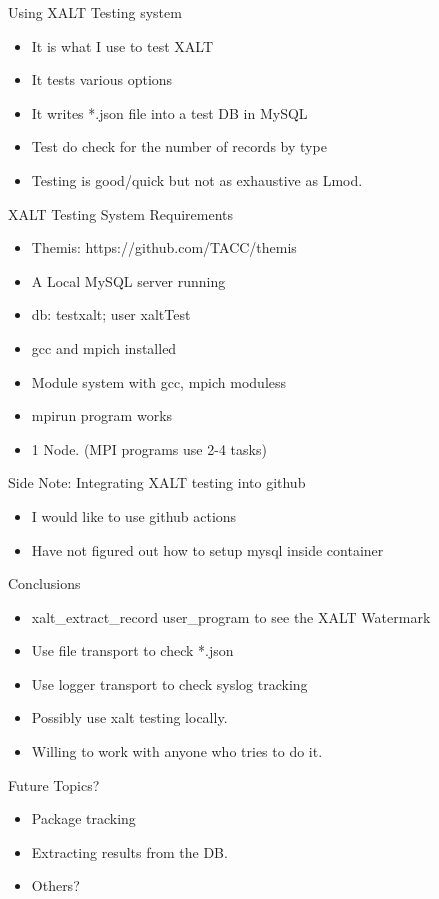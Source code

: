 \documentclass{beamer}
\begin{document}
\begin{frame}{Using XALT Testing system}
  \begin{itemize}
    \item It is what I use to test XALT
    \item It tests various options
    \item It writes *.json file into a test DB in MySQL
    \item Test do check for the number of records by type
    \item Testing is good/quick but not as exhaustive as Lmod.
  \end{itemize}
\end{frame}

\begin{frame}{XALT Testing System Requirements}
  \begin{itemize}
    \item Themis: https://github.com/TACC/themis
    \item A Local MySQL server running
    \item db: testxalt; user xaltTest
    \item gcc and mpich installed
    \item Module system with gcc, mpich moduless 
    \item mpirun program works
    \item 1 Node. (MPI programs use 2-4 tasks)
  \end{itemize}
\end{frame}

\begin{frame}{Side Note: Integrating XALT testing into github}
  \begin{itemize}
    \item I would like to use github actions
    \item Have not figured out how to setup mysql inside container
  \end{itemize}
\end{frame}


\begin{frame}{Conclusions}
  \begin{itemize}
    \item xalt\_extract\_record user\_program to see the XALT
      Watermark
    \item Use file transport to check *.json
    \item Use logger transport to check syslog tracking
    \item Possibly use xalt testing locally.
    \item Willing to work with anyone who tries to do it.
  \end{itemize}
\end{frame}


\begin{frame}{Future Topics?} 
  \begin{itemize}
    \item Package tracking
    \item Extracting results from the DB.
    \item Others?
  \end{itemize}
\end{frame}
%

%
\end{document}
